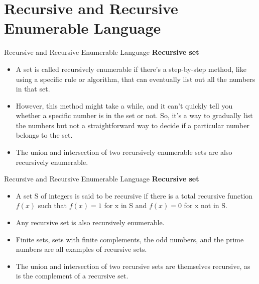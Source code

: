 \documentclass{beamer}
\begin{document}
\section{Recursive and Recursive Enumerable Language}
\begin{frame}{Recursive and Recursive Enumerable Language}
\textbf{Recursive set}
\begin{itemize}
	\item A set is called recursively enumerable if there's a step-by-step method, like using a specific rule or algorithm, that can eventually list out all the numbers in that set.
	\item However, this method might take a while, and it can't quickly tell you whether a specific number is in the set or not. So, it's a way to gradually list the numbers but not a straightforward way to decide if a particular number belongs to the set.
	\item The union and intersection of two recursively enumerable sets are also recursively enumerable.
\end{itemize}
\end{frame}
\begin{frame}{Recursive and Recursive Enumerable Language}
	\textbf{Recursive set}
	\begin{itemize}
		\item A set S of integers is said to be recursive if there is a total recursive function $f(x)$ such that $f(x)=1$ for x in S and $f(x)=0$ for x not in S. 
		\item Any recursive set is also recursively enumerable.
		\item Finite sets, sets with finite complements, the odd numbers, and the prime numbers are all examples of recursive sets.
		\item The union and intersection of two recursive sets are themselves recursive, as is the complement of a recursive set.
	\end{itemize}
\end{frame}
\end{document}
